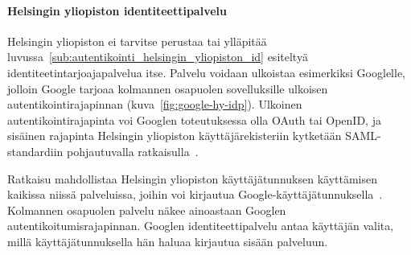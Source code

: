 \documentclass[finnish,gradu]{tktltiki}
\begin{document}




  \newpage
  \paragraph{Helsingin yliopiston identiteettipalvelu} \hfill %
  \label{par:helsingin_yliopiston_identiteettipalvelu}

  Helsingin yliopiston ei tarvitse perustaa tai ylläpitää luvussa~\ref{sub:autentikointi_helsingin_yliopiston_id} esiteltyä identiteetintarjoajapalvelua itse. Palvelu voidaan ulkoistaa esimerkiksi Googlelle, jolloin Google tarjoaa kolmannen osapuolen sovelluksille ulkoisen autentikointirajapinnan (kuva~\ref{fig:google-hy-idp}). Ulkoinen autentikointirajapinta voi Googlen toteutuksessa olla OAuth tai OpenID, ja sisäinen rajapinta Helsingin yliopiston käyttäjärekisteriin kytketään SAML-standardiin pohjautuvalla ratkaisulla~\cite{google_saml_doc}.

   Ratkaisu mahdollistaa Helsingin yliopiston käyttäjätunnuksen käyttämisen kaikissa niissä palveluissa, joihin voi kirjautua Google-käyttäjätunnuksella~\cite{google_shibboleth_doc}. Kolmannen osapuolen palvelu näkee ainoastaan Googlen autentikoitumisrajapinnan. Googlen identiteettipalvelu antaa käyttäjän valita, millä käyttäjätunnuksella hän haluaa kirjautua sisään palveluun.
\end{document}
